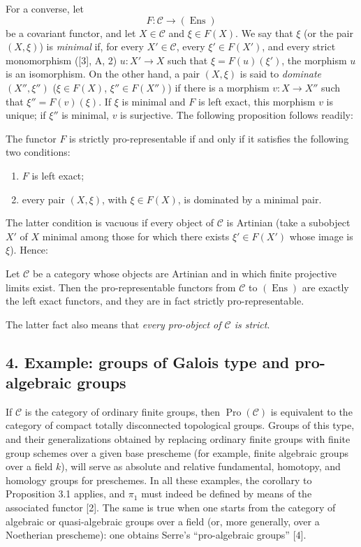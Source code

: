 For a converse, let
\[
  F:\mathcal C\longrightarrow(\operatorname{Ens})
\]
be a covariant functor, and let $X\in\mathcal C$ and $\xi\in F(X)$. We say
that $\xi$ (or the pair $(X,\xi)$) is \emph{minimal} if, for every
$X'\in\mathcal C$, every $\xi'\in F(X')$, and every strict monomorphism ([3],
A, 2) $u:X'\longrightarrow X$ such that $\xi=F(u)(\xi')$, the morphism $u$ is
an isomorphism. On the other hand, a pair $(X,\xi)$ is said to
\emph{dominate} $(X'',\xi'')$ ($\xi\in F(X)$, $\xi''\in F(X'')$) if there is
a morphism $v:X\longrightarrow X''$ such that $\xi''=F(v)(\xi)$. If $\xi$ is
minimal and $F$ is left exact, this morphism $v$ is unique; if $\xi''$ is
minimal, $v$ is surjective. The following proposition follows readily:

 The functor $F$ is strictly pro-representable if and
only if it satisfies the following two conditions:
\begin{enumerate}
\item[(i)] $F$ is left exact;
\item[(ii)] every pair $(X,\xi)$, with $\xi\in F(X)$, is dominated by a
minimal pair.
\end{enumerate}

The latter condition is vacuous if every object of $\mathcal C$ is Artinian
(take a subobject $X'$ of $X$ minimal among those for which there exists
$\xi'\in F(X')$ whose image is $\xi$). Hence:

 Let $\mathcal C$ be a category whose objects are Artinian
and in which finite projective limits exist. Then the pro-representable
functors from $\mathcal C$ to $(\operatorname{Ens})$ are exactly the left exact
functors, and they are in fact strictly pro-representable.

The latter fact also means that \emph{every pro-object of $\mathcal C$ is
strict}.

\subsection*{4. Example: groups of Galois type and pro-algebraic groups}

If $\mathcal C$ is the category of ordinary finite groups, then
$\operatorname{Pro}(\mathcal C)$ is equivalent to the category of compact
totally disconnected topological groups. Groups of this type, and their
generalizations obtained by replacing ordinary finite groups with finite group
schemes over a given base prescheme (for example, finite algebraic groups over
a field $k$), will serve as absolute and relative fundamental, homotopy, and
homology groups for preschemes. In all these examples, the corollary to
Proposition 3.1 applies, and $\pi_1$ must indeed be defined by means of the
associated functor [2]. The same is true when one starts from the category of
algebraic or quasi-algebraic groups over a field (or, more generally, over a
Noetherian prescheme): one obtains Serre's “pro-algebraic groups” [4].


